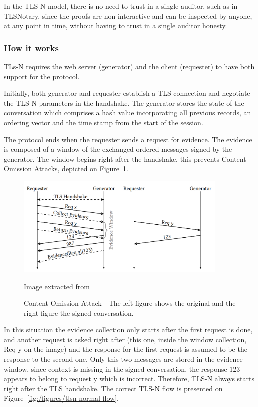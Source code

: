 In the TLS-N model, there is no need to trust in a single auditor, such as in TLSNotary, since the proofs are non-interactive and can be inspected by anyone, at any point in time, without having to trust in a single auditor honesty.


\subsubsection{How it works}
TLs-N requires the web server (generator) and the client (requester) to have both support for the protocol.

Initially, both generator and requester establish a TLS connection and negotiate the TLS-N parameters in the handshake. The generator stores the state of the conversation which comprises a hash value incorporating all previous records, an ordering vector and the time stamp from the start of the session.

The protocol ends when the requester sends a request for evidence. The evidence is composed of a window of the exchanged ordered messages signed by the generator. The window begins right after the handshake, this prevents Content Omission Attacks, depicted on Figure~\ref{fig:/figures/tlsn-content-omission}.

\begin{figure}[h]
    \begin{center}
      \leavevmode
      \includegraphics[width=0.9\textwidth]{figures/tlsn-content-omission.PNG}
      \caption{Content Omission Attack - The left figure shows the original and the right figure the signed conversation.}{Image extracted from \citet{Ritzdorf2017a}}
      \label{fig:/figures/tlsn-content-omission}
    \end{center}
\end{figure}

In this situation the evidence collection only starts after the first request is done, and another request is asked right after (this one, inside the window collection, Req y on the image) and the response for the first request is assumed to be the response to the second one. Only this two messages are stored in the evidence window, since context is missing in the signed conversation, the response 123 appears to belong to request y which is incorrect. Therefore, TLS-N always starts right after the TLS handshake. The correct TLS-N flow is presented on Figure~\ref{fig:/figures/tlsn-normal-flow}.


